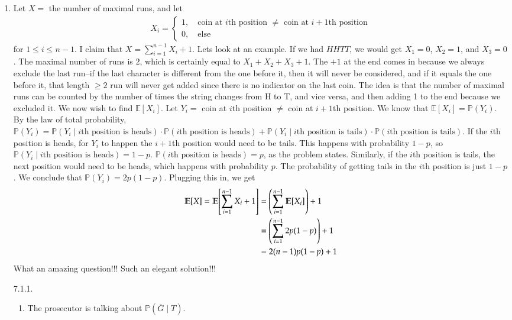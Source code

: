 \documentclass[12pt]{article}
\renewcommand{\P}{\mathbb{P}}
\theoremstyle{definition}
\theoremstyle{remark}
\newcommand{\E}{\mathbb{E}}
\begin{document}
\begin{enumerate}[leftmargin=\labelsep]
		\newpage
		\item Let $X = $ the number of maximal runs, and let \begin{align*}
			X_i = \begin{cases}
				1, \quad \text{coin at $i$th position $\neq$ coin at $i+1$th position} \\
				0, \quad \text{else}
			\end{cases}
		\end{align*}
		for $1 \leq i \leq n-1$. I claim that $X = \sum_{i=1}^{n-1} X_i + 1$. Lets look at an example. If we had $HHTT$, we would get $X_1 = 0$, $X_2 = 1$, and $X_3 = 0$. The maximal number of runs is $2$, which is certainly equal to $X_1 + X_2 + X_3 + 1$. The $+1$ at the end comes in because we always exclude the last run--if the last character is different from the one before it, then it will never be considered, and if it equals the one before it, that length $\geq 2$ run will never get added since there is no indicator on the last coin. The idea is that the number of maximal runs can be counted by the number of times the string changes from H to T, and vice versa, and then adding 1 to the end because we excluded it. We now wish to find $\E[X_i]$. Let $Y_i = $ coin at $i$th position $\neq$ coin at $i+1$th position. We know that $\E[X_i] = \P(Y_i)$. By the law of total probability, $\P(Y_i) = \P(Y_i \mid \text{$i$th position is heads}) \cdot \P(\text{$i$th position is heads}) + \P(Y_i \mid \text{$i$th position is tails}) \cdot \P(\text{$i$th position is tails})$. If the $i$th position is heads, for $Y_i$ to happen the $i+1$th position would need to be tails. This happens with probability $1-p$, so $\P(Y_i \mid \text{$i$th position is heads})=1-p$. $\P(\text{$i$th position is heads}) = p$, as the problem states. Similarly, if the $i$th position is tails, the next position would need to be heads, which happens with probability $p$. The probability of getting tails in the $i$th position is just $1-p$. We conclude that $\P(Y_i) = 2p(1-p)$. Plugging this in, we get
		\begin{align*}
			\E[X]=\E\qty[\sum_{i=1}^{n-1} X_i+1] &= \qty(\sum_{i=1}^{n-1} \E[X_i]) + 1 \\
			&= \qty(\sum_{i=1}^{n-1} 2p(1-p)) + 1 \\
			&= 2(n-1)p(1-p) + 1
		\end{align*}
		What an amazing question!!! Such an elegant solution!!!
		
		\newpage
		\item[7.1.1.]
		\begin{enumerate}
			\item The prosecutor is talking about $\P(\overline{G} \mid T)$.
			

\end{enumerate}
\end{enumerate}
\end{document}
